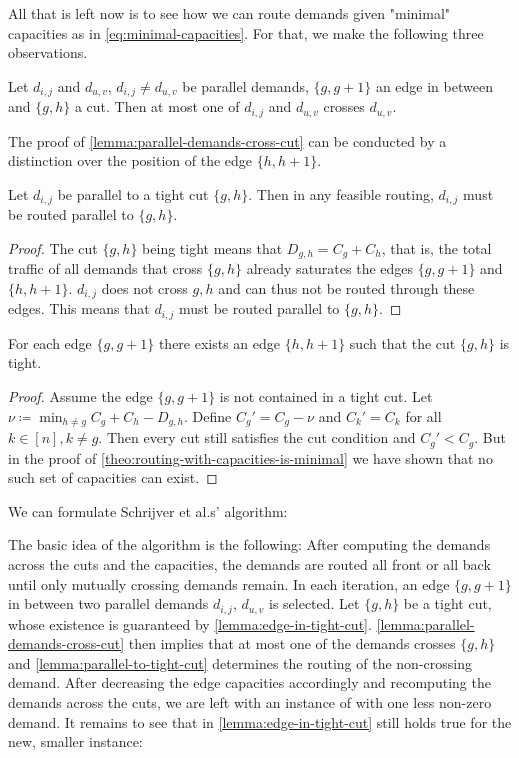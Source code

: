 All that is left now is to see how we can route demands given "minimal" capacities as in \cref{eq:minimal-capacities}.
For that, we make the following three observations.
\begin{lemma}
	\label{lemma:parallel-demands-cross-cut}
	Let $d_{i ,j}$ and $d_{u, v}$, $d_{i, j} \neq d_{u, v}$ be parallel demands, $\{g, g+1\}$ an edge in between and $\{g, h\}$ a cut.
	Then at most one of $d_{i ,j}$ and $d_{u, v}$ crosses $d_{u, v}$.
\end{lemma}
The proof of \cref{lemma:parallel-demands-cross-cut} can be conducted by a distinction over the position of the edge $\{h, h+1\}$.
\begin{lemma}
	\label{lemma:parallel-to-tight-cut}
	Let $d_{i, j}$ be parallel to a tight cut $\{g, h\}$.
	Then in any feasible routing, $d_{i, j}$ must be routed parallel to $\{g, h\}$.
\end{lemma}
\begin{proof}
	The cut $\{g, h\}$ being tight means that $D_{g, h} = C_g + C_h$, that is, the total traffic of all demands that cross $\{g, h\}$ already saturates the edges $\{g,g+1\}$ and $\{h, h+1\}$.
	$d_{i, j}$ does not cross ${g, h}$ and can thus not be routed through these edges.
	This means that $d_{i ,j}$ must be routed parallel to $\{g, h\}$.
\end{proof}
\begin{lemma}
	\label{lemma:edge-in-tight-cut}
	For each edge $\{g, g+1\}$ there exists an edge $\{h, h+1\}$ such that the cut $\{g, h\}$ is tight.
\end{lemma}
\begin{proof}
	Assume the edge $\{g, g+1\}$ is not contained in a tight cut.
	Let $\nu \coloneqq \min_{h \neq g} C_g + C_h - D_{g, h}$.
	Define $C_g' = C_g - \nu$ and $C_k' = C_k$ for all $k \in [n], k \neq g$.
	Then every cut still satisfies the cut condition and $C_g' < C_g$.
	But in the proof of \cref{theo:routing-with-capacities-is-minimal} we have shown that no such set of capacities can exist.
\end{proof}

We can formulate Schrijver et al.s' \cite{schrijver99} algorithm:



The basic idea of the algorithm is the following:
After computing the demands across the cuts and the capacities, the demands are routed all front or all back until only mutually crossing demands remain.
In each iteration, an edge $\{g, g+1\}$ in between two parallel demands $d_{i, j}$, $d_{u, v}$ is selected.
Let $\{g, h\}$ be a tight cut, whose existence is guaranteed by \cref{lemma:edge-in-tight-cut}.
\cref{lemma:parallel-demands-cross-cut} then implies that at most one of the demands crosses $\{g, h\}$ and \cref{lemma:parallel-to-tight-cut} determines the routing of the non-crossing demand.
After decreasing the edge capacities accordingly and recomputing the demands across the cuts, we are left with an instance of \RRLWC with one less non-zero demand.
It remains to see that in \cref{lemma:edge-in-tight-cut} still holds true for the new, smaller instance:

